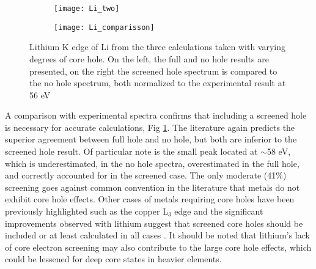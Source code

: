 \begin{figure}
	\centering
	\begin{subfigure}{0.45\textwidth}
		\texttt{[image: Li\_two]}
	\end{subfigure}
	\hspace{-0.01cm}
	\begin{subfigure}{0.45\textwidth}
		\texttt{[image: Li\_comparisson]}
	\end{subfigure}

	\caption{Lithium K edge of Li from the three calculations taken with varying degrees of core hole. On the left, the full and no hole results are presented, on the right the screened hole spectrum is compared to the no hole spectrum, both normalized to the experimental result at 56 eV }
	\label{Li_spectra}
\end{figure}


A comparison with experimental spectra confirms that including a screened hole is necessary for accurate calculations, Fig \ref{Li_spectra}. The literature again predicts the superior agreement between full hole and no hole, but both are inferior to the screened hole result.  Of particular note is the small peak located at $ \sim$58 eV, which is underestimated, in the no hole spectra, overestimated in the full hole, and correctly accounted for in the screened case.  The only moderate (41\%) screening goes against common convention in the literature that metals do not exhibit core hole effects.  Other cases of metals requiring core holes have been previously highlighted such as the copper L$_3$ edge and the significant improvements observed with lithium suggest that screened core holes should be included or at least calculated in all cases \cite{hebert_improvement_2003}.  It should be noted that lithium's lack of core electron screening may also contribute to the large core hole effects, which could be lessened for deep core states in heavier elements. 

